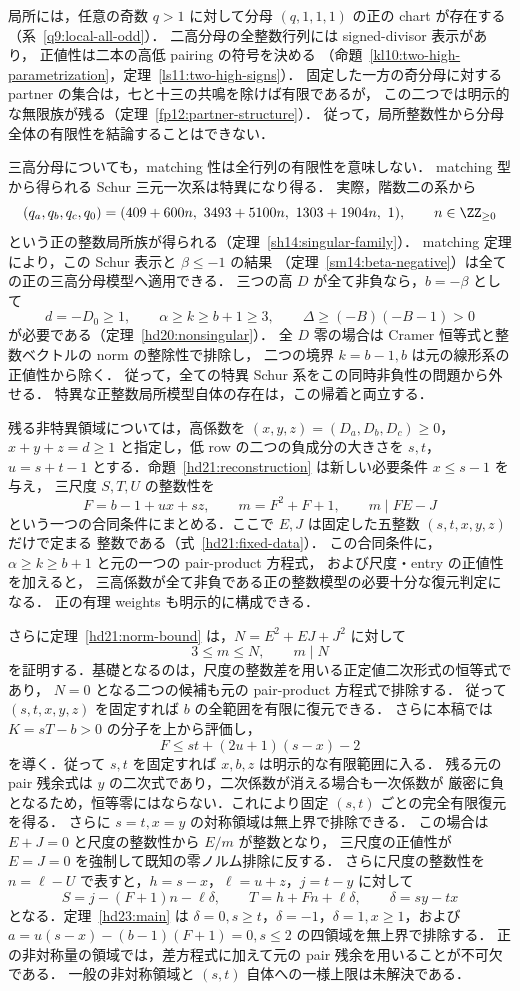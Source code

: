 局所には，任意の奇数 $q>1$ に対して分母 $(q,1,1,1)$ の正の chart が存在する
（系~\ref{q9:local-all-odd}）．
二高分母の全整数行列には signed-divisor 表示があり，
正値性は二本の高低 pairing の符号を決める
（命題~\ref{kl10:two-high-parametrization}，定理~\ref{ls11:two-high-signs}）．
固定した一方の奇分母に対する partner の集合は，七と十三の共鳴を除けば有限であるが，
この二つでは明示的な無限族が残る（定理~\ref{fp12:partner-structure}）．
従って，局所整数性から分母全体の有限性を結論することはできない．

三高分母についても，matching 性は全行列の有限性を意味しない．
matching 型から得られる Schur 三元一次系は特異になり得る．
実際，階数二の系から
\[
 (q_a,q_b,q_c,q_0)
 =(409+600n,\ 3493+5100n,\ 1303+1904n,\ 1),
 \qquad n\in\ZZ_{\ge0}
\]
という正の整数局所族が得られる（定理~\ref{sh14:singular-family}）．
matching 定理により，この Schur 表示と $\beta\le-1$ の結果
（定理~\ref{sm14:beta-negative}）は全ての正の三高分母模型へ適用できる．
三つの高 $D$ が全て非負なら，$b=-\beta$ として
\[
 d=-D_0\ge1,\qquad \alpha\ge k\ge b+1\ge3,
 \qquad \Delta\ge(-B)(-B-1)>0
\]
が必要である（定理~\ref{hd20:nonsingular}）．
全 $D$ 零の場合は Cramer 恒等式と整数ベクトルの norm の整除性で排除し，
二つの境界 $k=b-1,b$ は元の線形系の正値性から除く．
従って，全ての特異 Schur 系をこの同時非負性の問題から外せる．
特異な正整数局所模型自体の存在は，この帰着と両立する．

残る非特異領域については，高係数を
$(x,y,z)=(D_a,D_b,D_c)\ge0$，$x+y+z=d\ge1$ と指定し，低 row の二つの負成分の大きさを $s,t$，
$u=s+t-1$ とする．命題~\ref{hd21:reconstruction} は新しい必要条件 $x\le s-1$ を与え，
三尺度 $S,T,U$ の整数性を
\[
 F=b-1+ux+sz,\qquad m=F^2+F+1,\qquad m\mid FE-J
\]
という一つの合同条件にまとめる．ここで $E,J$ は固定した五整数 $(s,t,x,y,z)$ だけで定まる
整数である（式~\eqref{hd21:fixed-data}）．
この合同条件に，$\alpha\ge k\ge b+1$ と元の一つの pair-product 方程式，
および尺度・entry の正値性を加えると，
三高係数が全て非負である正の整数模型の必要十分な復元判定になる．
正の有理 weights も明示的に構成できる．

さらに定理~\ref{hd21:norm-bound} は，$N=E^2+EJ+J^2$ に対して
\[
 3\le m\le N,\qquad m\mid N
\]
を証明する．基礎となるのは，尺度の整数差を用いる正定値二次形式の恒等式であり，
$N=0$ となる二つの候補も元の pair-product 方程式で排除する．
従って $(s,t,x,y,z)$ を固定すれば $b$ の全範囲を有限に復元できる．
さらに本稿では $K=sT-b>0$ の分子を上から評価し，
\[
 F\le st+(2u+1)(s-x)-2
\]
を導く．従って $s,t$ を固定すれば $x,b,z$ は明示的な有限範囲に入る．
残る元の pair 残余式は $y$ の二次式であり，二次係数が消える場合も一次係数が
厳密に負となるため，恒等零にはならない．これにより固定 $(s,t)$ ごとの完全有限復元を得る．
さらに $s=t,x=y$ の対称領域は無上界で排除できる．
この場合は $E+J=0$ と尺度の整数性から $E/m$ が整数となり，
三尺度の正値性が $E=J=0$ を強制して既知の零ノルム排除に反する．
さらに尺度の整数性を $n=\ell-U$ で表すと，$h=s-x$，$\ell=u+z$，$j=t-y$ に対して
\[
 S=j-(F+1)n-\ell\delta,\qquad T=h+Fn+\ell\delta,
 \qquad \delta=sy-tx
\]
となる．定理~\ref{hd23:main} は
$\delta=0,s\ge t$，$\delta=-1$，$\delta=1,x\ge1$，および
$a=u(s-x)-(b-1)(F+1)=0,s\le2$ の四領域を無上界で排除する．
正の非対称量の領域では，差方程式に加えて元の pair 残余を用いることが不可欠である．
一般の非対称領域と $(s,t)$ 自体への一様上限は未解決である．

